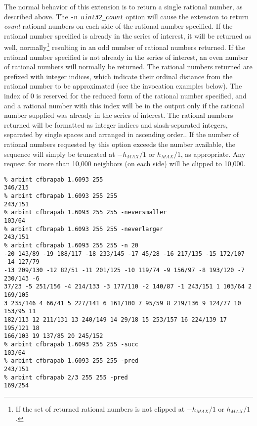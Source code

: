 \begin{tclcommanddescription}
The normal behavior of this extension is to return a single
rational number, as described above.
The \texttt{-n \emph{uint32\_count}} option will cause the extension
to return \emph{count} rational numbers on each side of the
rational number specified.  If the rational number specified is already
in the series of interest, it will be returned as well, normally\footnote{If
the set of returned rational numbers is not clipped at $-h_{MAX}/1$ or
$h_{MAX}/1$.} resulting
in an odd number of rational numbers returned.  If the rational number
specified is not already in the series of interest, an even number of
rational numbers will normally be returned.  The rational
numbers returned are prefixed with integer indices, which 
indicate their ordinal distance from the rational number to be approximated
(see the invocation examples below).  The index of 0 is reserved for
the reduced form of the rational number specified, and and a rational number with
this index will be in the output only if the rational number supplied was already
in the series of interest.
The rational numbers returned
will be formatted as integer indices and slash-separated integers, separated
by single spaces and arranged in ascending order..
If the number of rational numbers requested by this option exceeds
the number available, the sequence will simply be truncated at
$-h_{MAX}/1$ or $h_{MAX}/1$, as appropriate.  Any request for more than
10,000 neighbors (on each side) will be clipped to 10,000.
\end{tclcommanddescription}

\begin{tclcommandsampleinvocations}
\begin{scriptsize}
\begin{verbatim}
% arbint cfbrapab 1.6093 255
346/215
% arbint cfbrapab 1.6093 255 255
243/151
% arbint cfbrapab 1.6093 255 255 -neversmaller
103/64
% arbint cfbrapab 1.6093 255 255 -neverlarger
243/151
% arbint cfbrapab 1.6093 255 255 -n 20
-20 143/89 -19 188/117 -18 233/145 -17 45/28 -16 217/135 -15 172/107 -14 127/79
-13 209/130 -12 82/51 -11 201/125 -10 119/74 -9 156/97 -8 193/120 -7 230/143 -6
37/23 -5 251/156 -4 214/133 -3 177/110 -2 140/87 -1 243/151 1 103/64 2 169/105
3 235/146 4 66/41 5 227/141 6 161/100 7 95/59 8 219/136 9 124/77 10 153/95 11
182/113 12 211/131 13 240/149 14 29/18 15 253/157 16 224/139 17 195/121 18 
166/103 19 137/85 20 245/152
% arbint cfbrapab 1.6093 255 255 -succ
103/64
% arbint cfbrapab 1.6093 255 255 -pred
243/151
% arbint cfbrapab 2/3 255 255 -pred
169/254
\end{verbatim}
\end{scriptsize}
\end{tclcommandsampleinvocations}

